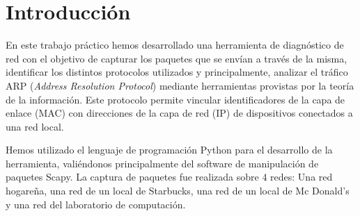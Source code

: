 \section{Introducción}

En este trabajo práctico hemos desarrollado una herramienta de diagnóstico de red con el objetivo de capturar los paquetes que se envían a través de la misma, identificar los distintos protocolos utilizados y principalmente, analizar el tráfico ARP (\textit{Address Resolution Protocol}) mediante herramientas provistas por la teoría de la información. Este protocolo permite vincular identificadores de la capa de enlace (MAC) con direcciones de la capa de red (IP) de dispositivos conectados a una red local.


Hemos utilizado el lenguaje de programación Python para el desarrollo de la herramienta, valiéndonos principalmente del software de manipulación de paquetes Scapy. La captura de paquetes fue realizada sobre 4 redes: Una red hogareña, una red de un local de Starbucks, una red de un local de Mc Donald's y una red del laboratorio de computación.

